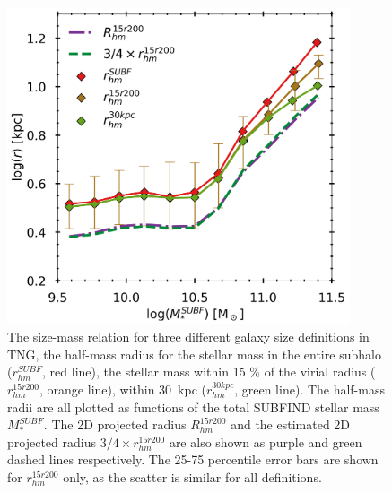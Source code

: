 \begin{figure}
    \centering
    \includegraphics[width=0.9\textwidth]{images/SM_R_tng.png}
    \caption{The size-mass relation for three different galaxy size definitions in TNG, the half-mass radius for the stellar mass in the entire subhalo ($r_{hm}^{SUBF}$, red line), the stellar mass within 15 \% of the virial radius ($r_{hm}^{15r200}$, orange line), within 30$\,$ kpc ($r_{hm}^{30kpc}$, green line). The half-mass radii are all plotted as functions of the total SUBFIND stellar mass $M^{SUBF}_\ast$. The 2D projected radius $R_{hm}^{15r200}$ and the estimated 2D projected radius $3/4 \times r_{hm}^{15r200}$ are also shown as purple and green dashed lines respectively. The 25-75 percentile error bars are shown for $r^{15r200}_{hm}$ only, as the scatter is similar for all definitions.}
    \label{SM_R_TNG}
\end{figure}


